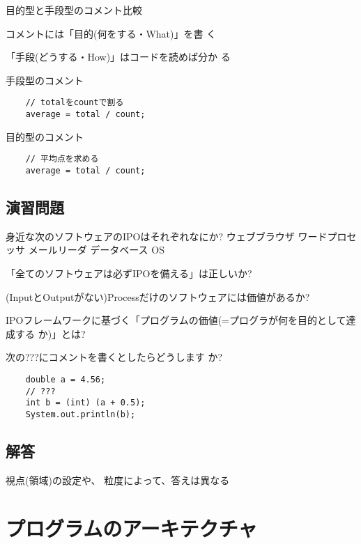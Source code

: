 \documentclass[a4j,papersize]{jsbook}
\begin{document}
目的型と手段型のコメント比較

コメントには「目的(何をする・What)」を書
く

「手段(どうする・How)」はコードを読めば分か
る

手段型のコメント
\begin{verbatim}
	// totalをcountで割る
	average = total / count;
\end{verbatim}

目的型のコメント
\begin{verbatim}
	// 平均点を求める
	average = total / count;
\end{verbatim}

\section{演習問題}
\begin{演習}
身近な次のソフトウェアのIPOはそれぞれなにか?
 ウェブブラウザ
 ワードプロセッサ
 メールリーダ
 データベース
 OS 
\end{演習}

\begin{演習}
「全てのソフトウェアは必ずIPOを備える」は正しいか?
\end{演習}

\begin{演習}
(InputとOutputがない)Processだけのソフトウェアには価値があるか?
\end{演習}

\begin{演習}
IPOフレームワークに基づく「プログラムの価値(=プログラが何を目的として達成する
か)」とは?
\end{演習}

\begin{演習}
 次の???にコメントを書くとしたらどうします
か?
\begin{verbatim}
	double a = 4.56;
	// ???
	int b = (int) (a + 0.5);
	System.out.println(b);
\end{verbatim}
\end{演習}
\section{解答}
\begin{解答}
 視点(領域)の設定や、
粒度によって、答えは異なる
\end{解答}

\chapter{プログラムのアーキテクチャ}
\end{document}
